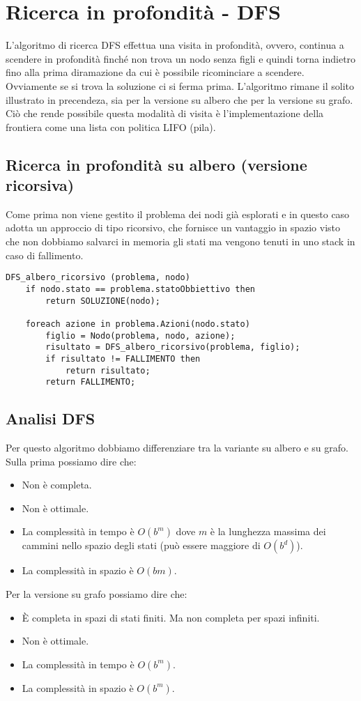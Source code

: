 \section{Ricerca in profondit\`a - DFS}
L'algoritmo di ricerca DFS effettua una visita in profondit\`a, ovvero, continua a scendere
in profondit\`a finch\'e non trova un nodo senza figli e quindi torna indietro fino alla
prima diramazione da cui \`e possibile ricominciare a scendere. Ovviamente se si trova la
soluzione ci si ferma prima. L'algoritmo rimane il solito illustrato in precendeza, sia per
la versione su albero che per la versione su grafo. Ci\`o che rende possibile questa
modalit\`a di visita \`e l'implementazione della frontiera come una lista con politica LIFO
(pila).

\subsection{Ricerca in profondit\`a su albero (versione ricorsiva)}
Come prima non viene gestito il problema dei nodi gi\`a esplorati e in questo caso adotta un
approccio di tipo ricorsivo, che fornisce un vantaggio in spazio visto che non dobbiamo
salvarci in memoria gli stati ma vengono tenuti in uno stack in caso di fallimento.
\begin{lstlisting}[style=pseudo-style]
DFS_albero_ricorsivo (problema, nodo)
	if nodo.stato == problema.statoObbiettivo then
		return SOLUZIONE(nodo);

	foreach azione in problema.Azioni(nodo.stato)
		figlio = Nodo(problema, nodo, azione);
		risultato = DFS_albero_ricorsivo(problema, figlio);
		if risultato != FALLIMENTO then
			return risultato;
		return FALLIMENTO;
\end{lstlisting}

\subsection{Analisi DFS}
Per questo algoritmo dobbiamo differenziare tra la variante su albero e su grafo. Sulla prima
possiamo dire che:
\begin{itemize}
	\item Non \`e completa.
	\item Non \`e ottimale.
	\item La complessit\`a in tempo \`e $O(b^m)$ dove $m$ \`e la lunghezza massima dei cammini
	      nello spazio degli stati (pu\`o essere maggiore di $O(b^d)$).
	\item La complessit\`a in spazio \`e $O(bm)$.
\end{itemize}
Per la versione su grafo possiamo dire che:
\begin{itemize}
	\item \`E completa in spazi di stati finiti. Ma non completa per spazi infiniti.
	\item Non \`e ottimale.
	\item La complessit\`a in tempo \`e $O(b^m)$.
	\item La complessit\`a in spazio \`e $O(b^m)$.
\end{itemize}

